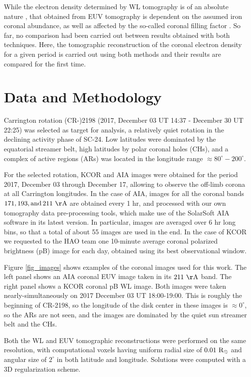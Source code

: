 \documentclass[baaa]{baaa}
\begin{document}
While the electron density determined by WL tomography is of an absolute nature \citep{frazin_2012}, that obtained from EUV tomography is dependent on the assumed iron coronal abundance, as well as affected by the so-called coronal filling factor \citep{frazin_2009}. So far, no comparison had been carried out between results obtained with both techniques. Here, the tomographic reconstruction of the coronal electron density for a given period is carried out using both methods and their results are compared for the first time.

\section{Data and Methodology}\label{method}

Carrington rotation (CR-)2198 (2017, December 03 UT 14:37 - December 30	UT 22:25) was selected as target for analysis, a relatively quiet rotation in the declining activity phase of SC-24. Low latitudes were dominated by the equatorial streamer belt, high latitudes by polar coronal holes (CHs), and a complex of active regions (ARs) was located in the longitude range $\approx 80^\circ-200^\circ$. 

For the selected rotation, KCOR and AIA images were obtained for the period 2017, December 03 through December 17, allowing to observe the off-limb corona at all Carrington longitudes. In the case of AIA, images for all the coronal bands $171, 193, \rm{and}\, 211~\AA$ are obtained every 1 hr, and processed with our own tomography data pre-processing tools, which make use of the SolarSoft AIA software in its latest version. In particular, images are averaged over 6 hr long bins, so that a total of about 55 images are used in the end. In the case of KCOR we requested to the HAO team one 10-minute average coronal polarized brightness (pB) image for each day, obtained using its best observational window. 

Figure \ref{fig_images} shows examples of the coronal images used for this work. The left panel shows an AIA coronal EUV image taken in its $211~\rm{\AA}$ band. The right panel shows a KCOR coronal pB WL image. Both images were taken nearly-simultaneously on 2017 December 03 UT 18:00-19:00. This is roughly the beginning of CR-2198, so the longitude of the disk center in these images is $\approx 0^\circ$, so the ARs are not seen, and the images are dominated by the quiet sun streamer belt and the CHs.

Both the WL and EUV tomographic reconstructions were performed on the same resolution, with computational voxels having uniform radial size of $0.01~\rm{R}_\odot$ and angular size of $2^\circ$ in both latitude and longitude. Solutions were computed with a 3D regularization scheme.
\end{document}

